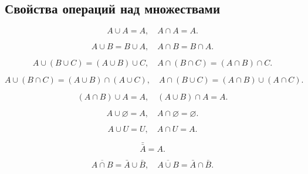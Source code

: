 \subsection{Свойства операций над множествами}

\begin{property}[Идемпотентность]
    \[
        A \cup A = A,
        \quad
        A \cap A = A.
    \]
\end{property}

\begin{property}[Коммутативность]
    \[
        A \cup B = B \cup A,
        \quad
        A \cap B = B \cap A.
    \]
\end{property}

\begin{property}[Ассоциативность]
    \[
        A \cup (B \cup C) = (A \cup B) \cup C,
        \quad
        A \cap (B \cap C) = (A \cap B) \cap C.
    \]
\end{property}

\begin{property}[Дистрибутивность]
    \[
        A \cup (B \cap C) = (A \cup B) \cap (A \cup C),
        \quad
        A \cap (B \cup C) = (A \cap B) \cup (A \cap C).
    \]
\end{property}

\begin{property}[Поглощение]
    \[
        (A \cap B) \cup A = A,
        \quad
        (A \cup B) \cap A = A.
    \]
\end{property}

\begin{property}
    \[
        A \cup \varnothing = A,
        \quad
        A \cap \varnothing = \varnothing.
    \]
\end{property}

\begin{property}
    \[
        A \cup U = U,
        \quad
        A \cap U = A.
    \]
\end{property}

\begin{property}[Инволютивность]
    \[
        \bar{\bar{A}} = A.
    \]
\end{property}

\begin{property}
    \[
        \overline{A \cap B} = \bar{A} \cup \bar{B},
        \quad
        \overline{A \cup B} = \bar{A} \cap \bar{B}.
    \]
\end{property}

